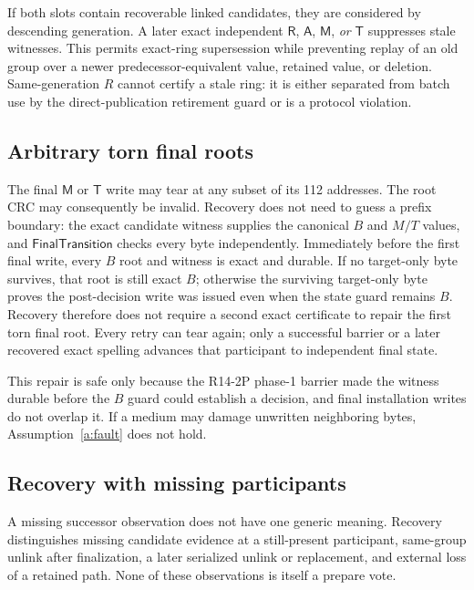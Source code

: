 \documentclass[10pt,twocolumn]{article}
\theoremstyle{remark}
\newcommand{\Root}{\mathsf{R}}
\newcommand{\Materialized}{\mathsf{M}}
\newcommand{\Tombstone}{\mathsf{T}}
\newcommand{\Abort}{\mathsf{A}}
\begin{document}
If both slots contain recoverable linked candidates, they are considered by descending generation.
A later exact independent $\Root$, $\Abort$, $\Materialized$, \emph{or} $\Tombstone$ suppresses
stale witnesses. This permits exact-ring supersession while preventing replay of an old group over
a newer predecessor-equivalent value, retained value, or deletion. Same-generation $R$ cannot
certify a stale ring: it is either
separated from batch use by the direct-publication retirement guard or is a protocol violation.

\subsection{Arbitrary torn final roots}

The final $\Materialized$ or $\Tombstone$ write may tear at any subset of its 112 addresses. The
root CRC may consequently be invalid. Recovery does not need to guess a prefix boundary: the exact
candidate witness supplies the canonical $B$ and $M/T$ values, and
$\mathsf{FinalTransition}$ checks every byte independently. Immediately before the first final
write, every $B$ root and witness is exact and durable. If no target-only byte survives, that root
is still exact $B$; otherwise the surviving target-only byte proves the post-decision write was
issued even when the state guard remains $B$. Recovery therefore does not require a second exact
certificate to repair the first torn final root. Every retry can tear again; only a successful
barrier or a later recovered exact spelling advances that participant to independent final state.

This repair is safe only because the R14-2P phase-1 barrier made the witness durable before the
$B$ guard could establish a decision, and final installation writes do not overlap it. If a medium
may damage unwritten neighboring bytes, Assumption~\ref{a:fault} does not hold.

\subsection{Recovery with missing participants}

A missing successor observation does not have one generic meaning. Recovery distinguishes missing
candidate evidence at a still-present participant, same-group unlink after finalization, a later
serialized unlink or replacement, and external loss of a retained path. None of these observations
is itself a prepare vote.
\end{document}
